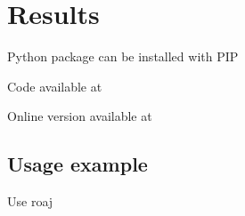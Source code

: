 \section{Results}

Python package can be installed with PIP

Code available at

Online version available at


\subsection{Usage example}

Use roaj

